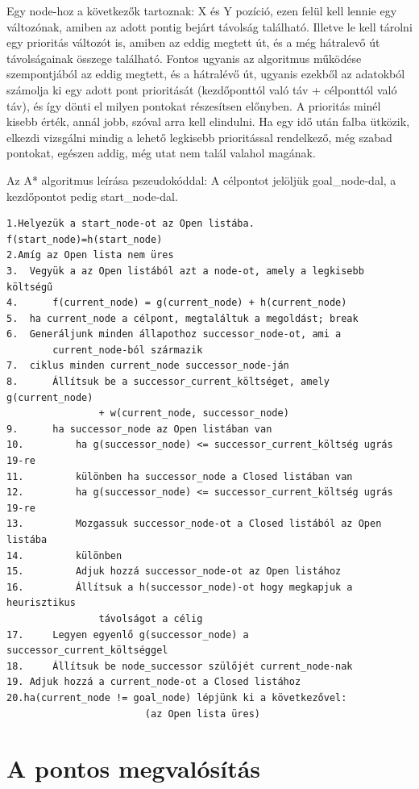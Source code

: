 Egy node-hoz a következők tartoznak: X és Y pozíció, ezen felül kell lennie egy változónak, amiben az adott pontig bejárt távolság található. Illetve le kell tárolni egy prioritás változót is, amiben az eddig megtett út, és a még hátralevő út távolságainak összege található.
Fontos ugyanis az algoritmus működése szempontjából az eddig megtett, és a hátralévő út, ugyanis ezekből az adatokból számolja ki egy adott pont prioritását (kezdőponttól való táv + célponttól való táv), és így dönti el milyen pontokat részesítsen előnyben. A prioritás minél kisebb érték, annál jobb, szóval arra kell elindulni. Ha egy idő után falba ütközik, elkezdi vizsgálni mindig a lehető legkisebb prioritással rendelkező, még szabad pontokat, egészen addig, még utat nem talál valahol magának.

Az A* algoritmus leírása pszeudokóddal:
A célpontot jelöljük goal\_node-dal, a kezdőpontot pedig start\_node-dal.

\begin{verbatim} 
1.Helyezük a start_node-ot az Open listába. f(start_node)=h(start_node)
2.Amíg az Open lista nem üres
3.	Vegyük a az Open listából azt a node-ot, amely a legkisebb költségű
4.		f(current_node) = g(current_node) + h(current_node)
5.	ha current_node a célpont, megtaláltuk a megoldást; break
6.	Generáljunk minden állapothoz successor_node-ot, ami a 
		current_node-ból származik
7.	ciklus minden current_node successor_node-ján
8.		Állítsuk be a successor_current_költséget, amely g(current_node) 
				+ w(current_node, successor_node)
9.		ha successor_node az Open listában van
10.			ha g(successor_node) <= successor_current_költség ugrás 19-re
11.			különben ha successor_node a Closed listában van
12.			ha g(successor_node) <= successor_current_költség ugrás 19-re
13.			Mozgassuk successor_node-ot a Closed listából az Open listába
14.		    különben
15.			Adjuk hozzá successor_node-ot az Open listához
16.			Állítsuk a h(successor_node)-ot hogy megkapjuk a heurisztikus 
				távolságot a célig
17.		Legyen egyenlő g(successor_node) a successor_current_költséggel
18.		Állítsuk be node_successor szülőjét current_node-nak
19.	Adjuk hozzá a current_node-ot a Closed listához
20.ha(current_node != goal_node) lépjünk ki a következővel: 
						(az Open lista üres)
\end{verbatim}

\section{A pontos megvalósítás}

